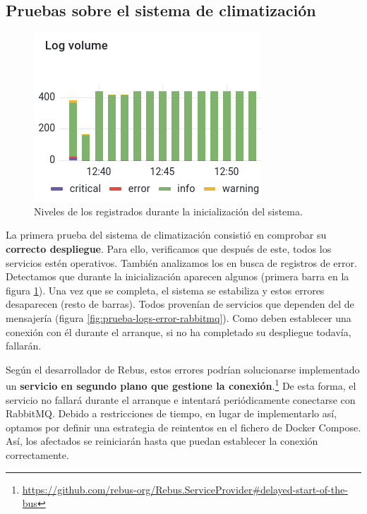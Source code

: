 \subsection{Pruebas sobre el sistema de climatización}

\begin{figure}
  \vspace{-15pt}
  \centering
  \includegraphics[scale=0.50]{cap_despliegue/images/pruebas-logs-error}
  \caption{Niveles de los  registrados durante la inicialización del sistema.}
  \label{fig:pruebas-logs-inicializacion}
  \vspace{-15pt}
\end{figure}

La primera prueba del sistema de climatización consistió en comprobar su \textbf{correcto despliegue}. Para ello, verificamos que después de este, todos los servicios estén operativos. También analizamos los  en busca de registros de error. Detectamos que durante la inicialización aparecen algunos (primera barra en la figura \ref{fig:pruebas-logs-inicializacion}). Una vez que se completa, el sistema se estabiliza y estos errores desaparecen (resto de barras). Todos provenían de servicios que dependen del  de mensajería (figura \ref{fig:prueba-logs-error-rabbitmq}). Como deben establecer una conexión con él durante el arranque, si no ha completado su despliegue todavía, fallarán.

Según el desarrollador de Rebus, estos errores podrían solucionarse implementado un \textbf{servicio en segundo plano que gestione la conexión}.\footnote{\url{https://github.com/rebus-org/Rebus.ServiceProvider\#delayed-start-of-the-bus}} De esta forma, el servicio no fallará durante el arranque e intentará periódicamente conectarse con RabbitMQ. Debido a restricciones de tiempo, en lugar de implementarlo así, optamos por definir una estrategia de reintentos en el fichero de Docker Compose. Así, los afectados se reiniciarán hasta que puedan establecer la conexión correctamente.

